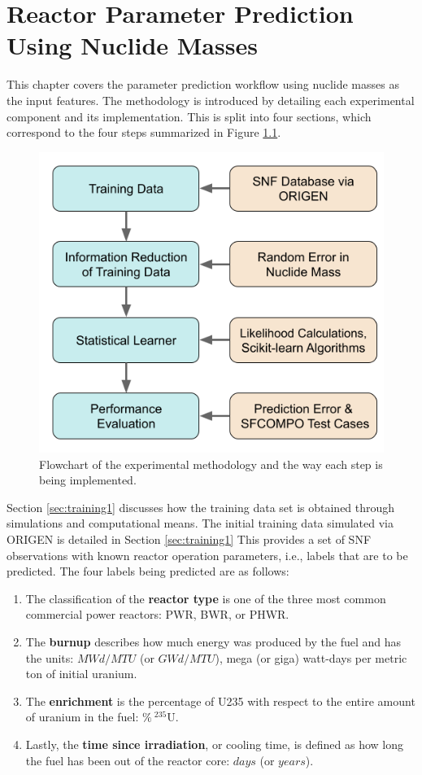
\glsresetall

\chapter{Reactor Parameter Prediction Using Nuclide Masses}
\label{ch:exp1}

This chapter covers the parameter prediction workflow using nuclide masses as
the input features. The methodology is introduced by detailing each
experimental component and its implementation. This is split into four
sections, which correspond to the four steps summarized in Figure
\ref{fig:method1}.

\begin{figure}[!ht]
  \centering
  \includegraphics[width=0.7\linewidth]{./chapters/exp1/methodology1.png}
  \caption{Flowchart of the experimental methodology and the way each step is being implemented.}
  \label{fig:method1}
\end{figure}

Section \ref{sec:training1} discusses how the training data set is obtained
through simulations and computational means. The initial training data
simulated via \gls{ORIGEN} is detailed in Section \ref{sec:training1} This
provides a set of \gls{SNF} observations with known reactor operation
parameters, i.e., labels that are to be predicted. The four labels being
predicted are as follows:
\begin{enumerate}
  \item The classification of the \textbf{reactor type} is one of the three
        most common commercial power reactors: \gls{PWR}, \gls{BWR}, or 
        \gls{PHWR}.
  \item The \textbf{burnup} describes how much energy was produced by the fuel
        and has the units: $MWd/MTU$ (or $GWd/MTU$), mega (or giga) 
        watt-days per metric ton of initial uranium.
  \item The \textbf{enrichment} is the percentage of \gls{U235} with respect to
        the entire amount of uranium in the fuel: $\%\:{}^{235}\text{U}$. 
  \item Lastly, the \textbf{time since irradiation}, or cooling time, is
        defined as how long the fuel has been out of the reactor core: $days$ 
        (or $years$).
\end{enumerate}

